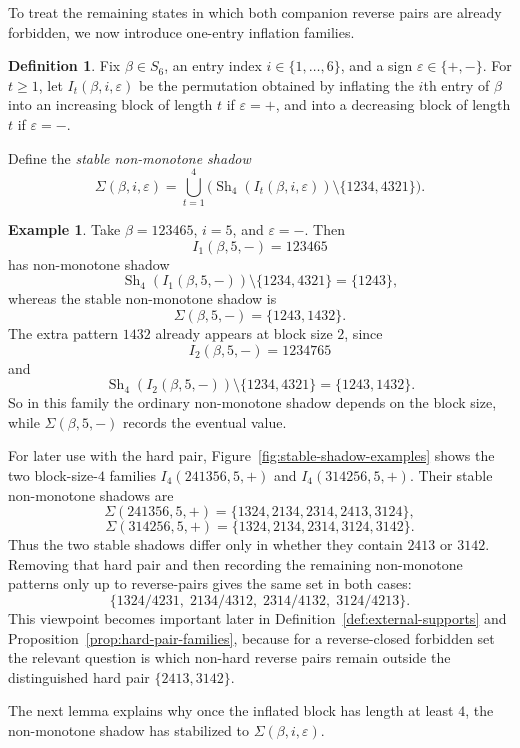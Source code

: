 \documentclass[11pt]{amsart}
\newcommand{\Sym}{S}
\newcommand{\Sh}{\operatorname{Sh}}
\theoremstyle{plain}
\theoremstyle{definition}
\newtheorem{definition}[theorem]{Definition}
\newtheorem{example}[theorem]{Example}
\theoremstyle{remark}
\begin{document}
To treat the remaining states in which both companion reverse pairs are already forbidden, we now
introduce one-entry inflation families.

\begin{definition}
  Fix $\beta \in \Sym_6$, an entry index $i \in \{1,\dots,6\}$, and a sign $\varepsilon \in \{+,-\}$.
  For $t \geq 1$, let $I_t(\beta,i,\varepsilon)$ be the permutation obtained by inflating the $i$th
  entry of $\beta$ into an increasing block of length $t$ if $\varepsilon=+$, and into a decreasing
  block of length $t$ if $\varepsilon=-$.

  Define the \emph{stable non-monotone shadow}
  \[
    \Sigma(\beta,i,\varepsilon)=\bigcup_{t=1}^4
    \bigl(\Sh_4(I_t(\beta,i,\varepsilon))\setminus\{1234,4321\}\bigr).
  \]
\end{definition}

\begin{example}
  Take $\beta=123465$, $i=5$, and $\varepsilon=-$.  Then
  \[
    I_1(\beta,5,-)=123465
  \]
  has non-monotone shadow
  \[
    \Sh_4(I_1(\beta,5,-))\setminus\{1234,4321\}=\{1243\},
  \]
  whereas the stable non-monotone shadow is
  \[
    \Sigma(\beta,5,-)=\{1243,1432\}.
  \]
  The extra pattern $1432$ already appears at block size $2$, since
  \[
    I_2(\beta,5,-)=1234765
  \]
  and
  \[
    \Sh_4(I_2(\beta,5,-))\setminus\{1234,4321\}=\{1243,1432\}.
  \]
  So in this family the ordinary non-monotone shadow depends on the block size, while
  $\Sigma(\beta,5,-)$ records the eventual value.
\end{example}

For later use with the hard pair, Figure~\ref{fig:stable-shadow-examples} shows the two
block-size-$4$ families $I_4(241356,5,+)$ and $I_4(314256,5,+)$. Their stable non-monotone shadows
are
\[
  \Sigma(241356,5,+)=\{1324,2134,2314,2413,3124\},
\]
\[
  \Sigma(314256,5,+)=\{1324,2134,2314,3124,3142\}.
\]
Thus the two stable shadows differ only in whether they contain $2413$ or $3142$.  Removing that
hard pair and then recording the remaining non-monotone patterns only up to reverse-pairs gives the
same set in both cases:
\[
  \{1324/4231,\; 2134/4312,\; 2314/4132,\; 3124/4213\}.
\]
This viewpoint becomes important later in Definition~\ref{def:external-supports} and
Proposition~\ref{prop:hard-pair-families}, because for a reverse-closed forbidden set the relevant
question is which non-hard reverse pairs remain outside the distinguished hard pair
$\{2413,3142\}$.

The next lemma explains why once the inflated block has length at least $4$, the non-monotone
shadow has stabilized to $\Sigma(\beta,i,\varepsilon)$.
\end{document}
